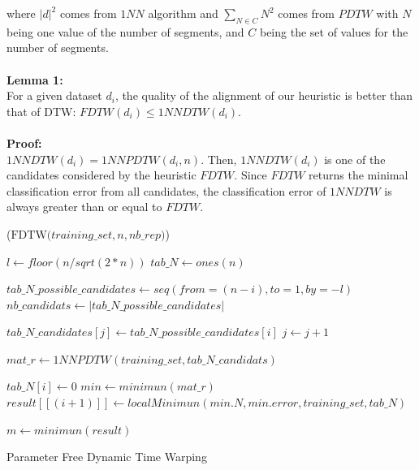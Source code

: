 where $|d|^{2}$ comes from $1NN$ algorithm and
$\underset{N\in C}{\sum}{\displaystyle N^{2}}$ comes from $PDTW$ with $N$ being one value of the
number of segments, and  $C$ being the set of values for the number of segments. 



\paragraph{}\textbf{Lemma 1: } \\
For a given dataset $d_i$, the quality of the alignment of our heuristic
is better than that of DTW: $ FDTW(d_{i}) \leq 1NNDTW(d_{i}) $.


\paragraph{}\textbf{Proof: } \\
 $1NNDTW(d_i) = 1NNPDTW(d_i,n)$. Then, $1NNDTW(d_i)$ is one of the
candidates considered by the heuristic $FDTW$. Since $FDTW$ returns the
minimal classification error from all candidates, the classification error of
$1NNDTW$ is always greater than or equal to $FDTW$.



\begin{algorithm}[h]
\DontPrintSemicolon
{}

\Begin($\text{FDTW} {(} training\_set, n, nb\_rep {)}$)
{
  $l \leftarrow floor(n/sqrt(2 * n))$\;
  $tab\_N \leftarrow ones(n)$\;
  {
    $tab\_N\_possible\_candidates \leftarrow seq(from = (n - i), to = 1, by = -l)$\;
    $nb\_candidats \leftarrow |tab\_N\_possible\_candidates|$\;

    {
      {
       $tab\_N\_candidates[j] \leftarrow tab\_N\_possible\_candidates[i] $\;
       $j \leftarrow j + 1$
      }

    }
    $mat\_r \leftarrow 1NNPDTW(training\_set, tab\_N\_candidats)$ \;


    {
        $tab\_N[i] \leftarrow 0 $
    }
    $min \leftarrow minimun(mat\_r) $\;
    $result[[(i + 1)]]   \leftarrow localMinimun(min.N,  min.error, training\_set,
    tab\_N)$\;
      
  }
  $m \leftarrow minimun(result)$\;
    

}
\caption{Parameter Free Dynamic Time Warping}\label{algo5}
\end{algorithm}

